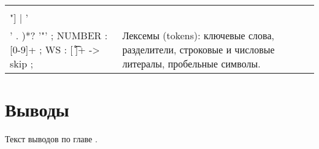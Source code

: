 \begin{longtable}{|p{3in}|p{3in}|}
    \begin{minipage}{3in}
        \begin{verbatim}
// Лексемы (tokens)
PROJECT     : 'project';
SOURCES     : 'sources';
STREAMING   : 'streaming';
STORAGE     : 'storage';
BI          : 'bi';
KAFKA       : 'kafka';
CONNECT     : 'connect';
CLICKHOUSE  : 'clickhouse';
SUPERSET    : 'superset';
NAME        : 'name';
VERSION     : 'version';
DESCRIPTION : 'description';
TYPE        : 'type';
PORT        : 'port';
USERNAME    : 'username';
PASSWORD    : 'password';
ACCESS_KEY  : 'access_key';
SECRET_KEY  : 'secret_key';
REGION      : 'region';
BUCKET      : 'bucket';
NUM_BROKERS : 'num_brokers';
POSTGRES    : 'postgres';
S3          : 's3';
COLON       : ':';
DASH        : '-';
STRING      : '"' ( ~[\\"] | '\\' . )*? '"' ;
NUMBER      : [0-9]+ ;
WS          : [ \t\r\n]+ -> skip ;
    \end{verbatim}
    \end{minipage}
                                 &
    \begin{minipage}{2.6in}
        Лексемы (tokens): ключевые слова, разделители, строковые и числовые литералы, пробельные символы.                                                                                     \end{minipage} \\ \hline
\end{longtable}



\section{Выводы} \label{ch3:conclusion}

Текст выводов по главе \thechapter.


%
